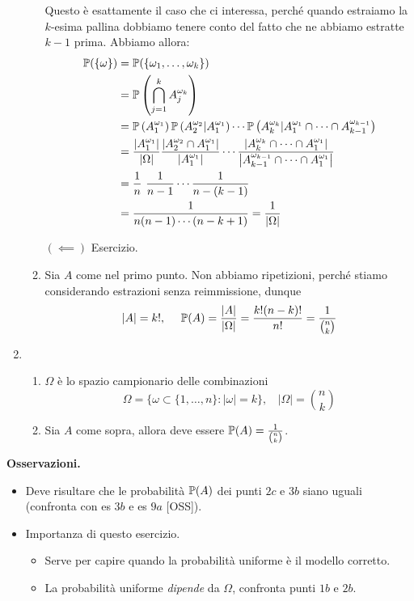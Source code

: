 \begin{enumerate}
\begin{enumerate}
		\begin{oss}
			Questo è esattamente il caso che ci interessa, perché quando estraiamo la $k$-esima pallina dobbiamo tenere conto del fatto che ne abbiamo estratte $k-1$ prima. Abbiamo allora:
			\begin{align*}
				\mathbb{P}(\{\omega \}) & =\mathbb{P}(\{\omega_{1} ,\dots ,\omega_{k}\})\\
				 & =\mathbb{P}\left(\bigcap_{j=1}^{k} A_{j}^{\omega_{k}}\right)\\
				 & =\mathbb{P}\left(A_{1}^{\omega_{1}}\right)\mathbb{P}\left(A_{2}^{\omega_{2}} |A_{1}^{\omega_{1}}\right) \cdots \mathbb{P}\left(A_{k}^{\omega_{k}} |A_{1}^{\omega_{1}} \cap \cdots \cap A_{k-1}^{\omega_{k-1}}\right)\\
				 & =\frac{\left| A_{1}^{\omega_{1}}\right| }{| \Omega | }\frac{\left| A_{2}^{\omega_{2}} \cap A_{1}^{\omega_{1}}\right| }{\left| A_{1}^{\omega_{1}}\right| } \cdots \frac{| A_{k}^{\omega_{k}} \cap \cdots \cap A_{1}^{\omega_{1}} |}{\left| A_{k-1}^{\omega_{k-1}} \cap \cdots \cap A_{1}^{\omega_{1}}\right| }\\
				 & =\frac{1}{n} \ \frac{1}{n-1} \cdots \frac{1}{n-(k-1)}\\
				 & =\frac{1}{n(n-1) \cdots (n-k+1)} =\frac{1}{| \Omega | }
			\end{align*}
		\end{oss}

		$(\impliedby)$ Esercizio.
		\item Sia $A$ come nel primo punto. Non abbiamo ripetizioni, perché stiamo considerando estrazioni senza reimmissione, dunque
		\begin{equation*}
			| A| =k!,\ \ \ \ \mathbb{P}(A) =\frac{| A| }{| \Omega | } =\frac{k!(n-k) !}{n!} =\frac{1}{\binom{n}{k}}
		\end{equation*}
	\end{enumerate}
	\item 
	\begin{enumerate}
		\item $\Omega $ è lo spazio campionario delle combinazioni
		\begin{equation*}
			\Omega =\{\omega \subset \{1,\dots ,n\} :| \omega | =k\} ,\ \ \ \ | \Omega | =\binom{n}{k}
		\end{equation*}
		\item Sia $A$ come sopra, allora deve essere $\mathbb{P}(A) =\frac{1}{\binom{n}{k}}$.
	\end{enumerate}
\end{enumerate}

\textbf{Osservazioni.}
\begin{itemize}
	\item Deve risultare che le probabilità $\mathbb{P}(A)$ dei punti $2c$ e $3b$ siano uguali (confronta con es $3b$ e es $9a$ [OSS]).
	\item Importanza di questo esercizio.
	\begin{itemize}
		\item Serve per capire quando la probabilità uniforme è il modello corretto.
		\item La probabilità uniforme \textit{dipende} da $\Omega $, confronta punti $1b$ e $2b$.
	\end{itemize}
\end{itemize}

